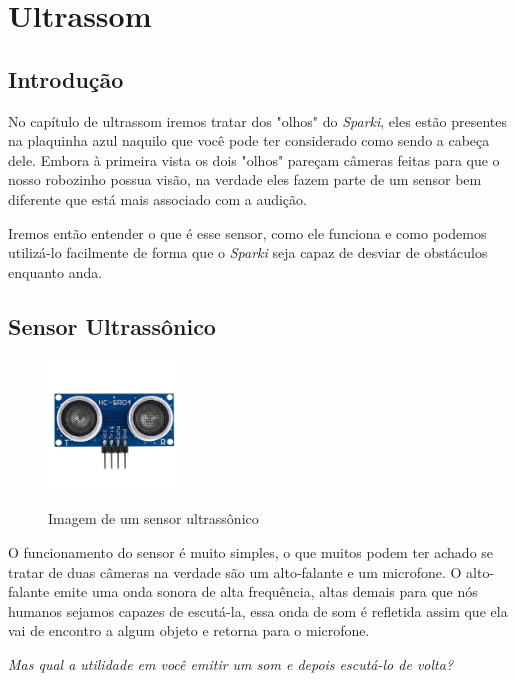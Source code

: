 \chapter{Ultrassom}

\section*{Introdução}

    No capítulo de ultrassom iremos tratar dos "olhos" do \textit{Sparki}, eles estão presentes na plaquinha azul naquilo que você pode ter considerado como sendo a cabeça dele. Embora à primeira vista os dois "olhos" pareçam câmeras feitas para que o nosso robozinho possua visão, na verdade eles fazem parte de um sensor bem diferente que está mais associado com a audição. 
    
    Iremos então entender o que é esse sensor, como ele funciona e como podemos utilizá-lo facilmente de forma que o \textit{Sparki} seja capaz de desviar de obstáculos enquanto anda.
    
\section{Sensor Ultrassônico}
    
    \begin{figure}[h]
    \caption{Imagem de um sensor ultrassônico}
     
    \centering 
    \includegraphics[width=3.5cm]{Figuras/ultrassom.jpg}
    \label{figura:ultrassom.jpeg}
    \end{figure}
    
    O funcionamento do sensor é muito simples, o que muitos podem ter achado se tratar de duas câmeras na verdade são um alto-falante e um microfone. O alto-falante emite uma onda sonora de alta frequência, altas demais para que nós humanos sejamos capazes de escutá-la, essa onda de som é refletida assim que ela vai de encontro a algum objeto e retorna para o microfone.
    
    \textit{Mas qual a utilidade em você emitir um som e depois escutá-lo de volta?}
    
